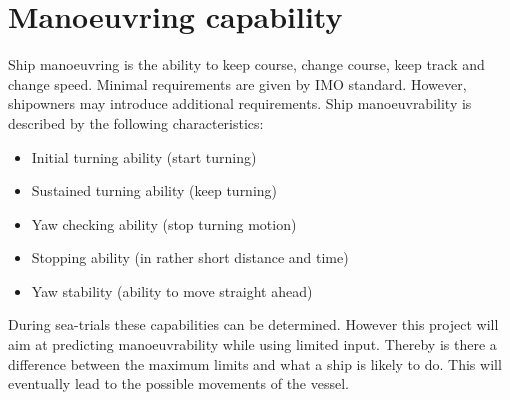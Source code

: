 \chapter*{Manoeuvring capability}
Ship manoeuvring is the ability to keep course, change course, keep track and change speed. Minimal requirements are given by \ac{IMO} standard. However, shipowners may introduce additional requirements. 
Ship manoeuvrability is described by the following characteristics: 
\begin{itemize}
	\item Initial turning ability (start turning)
	\item Sustained turning ability (keep turning)
	\item Yaw checking ability (stop turning motion)
	\item Stopping ability (in rather short distance and time)
	\item Yaw stability (ability to move straight ahead)
\end{itemize}
During sea-trials these capabilities can be determined. However this project will aim at predicting manoeuvrability while using limited input. Thereby is there a difference between the maximum limits and what a ship is likely to do. This will eventually lead to the possible movements of the vessel.


